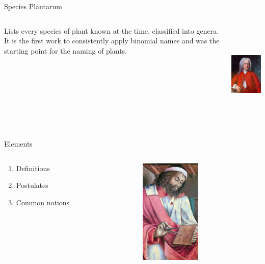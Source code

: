 \documentclass[10pt]{beamer}
\begin{document}
\begin{frame}{Species Plantarum}
    \begin{columns}
        \begin{column}{0.6\textwidth}
			Lists every species of plant known at the time, classified into genera. It is the first work to consistently apply binomial names and was the starting point for the naming of plants.
        \end{column}
        \begin{column}{0.4\textwidth}  %
                \begin{center}
					\includegraphics[height=5cm]{images/LinnaeusWeddingPortrait.jpg}
                \end{center}
        \end{column}
    \end{columns}
\end{frame}


\begin{frame}{Elements}
	\begin{columns}
        \begin{column}{0.6\textwidth}
			\begin{enumerate}
				\item Definitions
				\item Postulates
				\item Common notions
			\end{enumerate}
		\end{column}
        \begin{column}{0.4\textwidth}  %
                \begin{center}
					\includegraphics[height=5cm]{images/euclid.jpg}
                \end{center}
        \end{column}
	\end{columns}
\end{frame}
\end{document}

